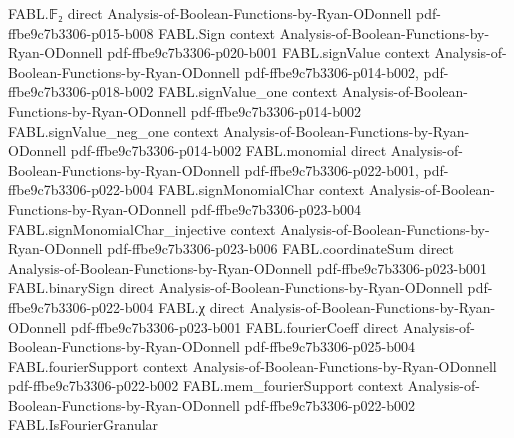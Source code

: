 \begin{theorem}
\label{FABL.isVectorFourierGranular_setIndicator_binaryAffineSubspace}
\leanok
{}
\proofstep
  {FABL.𝔽₂}
  {direct}
  {Analysis-of-Boolean-Functions-by-Ryan-ODonnell}
  {pdf-ffbe9c7b3306-p015-b008}
\proofstep
  {FABL.Sign}
  {context}
  {Analysis-of-Boolean-Functions-by-Ryan-ODonnell}
  {pdf-ffbe9c7b3306-p020-b001}
\proofstep
  {FABL.signValue}
  {context}
  {Analysis-of-Boolean-Functions-by-Ryan-ODonnell}
  {pdf-ffbe9c7b3306-p014-b002,
    pdf-ffbe9c7b3306-p018-b002}
\proofstep
  {FABL.signValue_one}
  {context}
  {Analysis-of-Boolean-Functions-by-Ryan-ODonnell}
  {pdf-ffbe9c7b3306-p014-b002}
\proofstep
  {FABL.signValue_neg_one}
  {context}
  {Analysis-of-Boolean-Functions-by-Ryan-ODonnell}
  {pdf-ffbe9c7b3306-p014-b002}
\proofstep
  {FABL.monomial}
  {direct}
  {Analysis-of-Boolean-Functions-by-Ryan-ODonnell}
  {pdf-ffbe9c7b3306-p022-b001,
    pdf-ffbe9c7b3306-p022-b004}
\proofstep
  {FABL.signMonomialChar}
  {context}
  {Analysis-of-Boolean-Functions-by-Ryan-ODonnell}
  {pdf-ffbe9c7b3306-p023-b004}
\proofstep
  {FABL.signMonomialChar_injective}
  {context}
  {Analysis-of-Boolean-Functions-by-Ryan-ODonnell}
  {pdf-ffbe9c7b3306-p023-b006}
\proofstep
  {FABL.coordinateSum}
  {direct}
  {Analysis-of-Boolean-Functions-by-Ryan-ODonnell}
  {pdf-ffbe9c7b3306-p023-b001}
\proofstep
  {FABL.binarySign}
  {direct}
  {Analysis-of-Boolean-Functions-by-Ryan-ODonnell}
  {pdf-ffbe9c7b3306-p022-b004}
\proofstep
  {FABL.χ}
  {direct}
  {Analysis-of-Boolean-Functions-by-Ryan-ODonnell}
  {pdf-ffbe9c7b3306-p023-b001}
\proofstep
  {FABL.fourierCoeff}
  {direct}
  {Analysis-of-Boolean-Functions-by-Ryan-ODonnell}
  {pdf-ffbe9c7b3306-p025-b004}
\proofstep
  {FABL.fourierSupport}
  {context}
  {Analysis-of-Boolean-Functions-by-Ryan-ODonnell}
  {pdf-ffbe9c7b3306-p022-b002}
\proofstep
  {FABL.mem_fourierSupport}
  {context}
  {Analysis-of-Boolean-Functions-by-Ryan-ODonnell}
  {pdf-ffbe9c7b3306-p022-b002}
\proofstep
  {FABL.IsFourierGranular}

\end{theorem}
